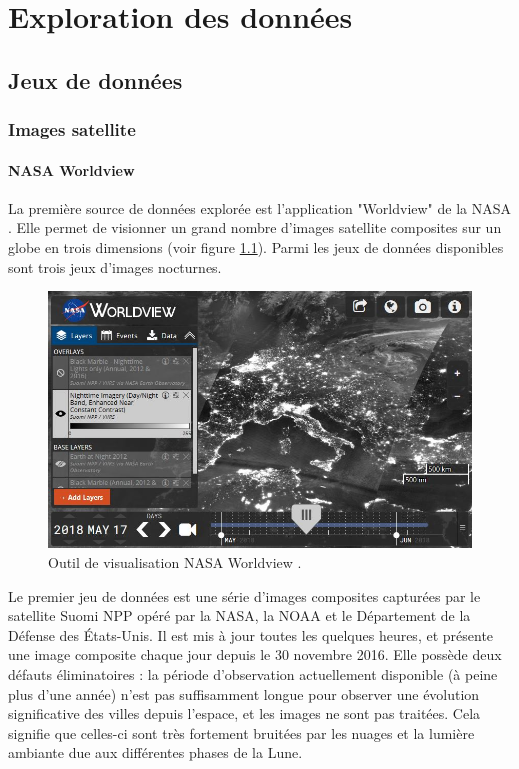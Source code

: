 \documentclass[a4paper, 11pt]{report}
\begin{document}
\chapter{Exploration des données}
\section{Jeux de données}
\subsection{Images satellite}
\subsubsection{NASA Worldview}
La première source de données explorée est l'application "Worldview" de la NASA \cite{nasa-worldview}. Elle permet de visionner un grand nombre d'images satellite composites sur un globe en trois dimensions (voir figure \ref{nasa-worldview-screenshot}). Parmi les jeux de données disponibles sont trois jeux d'images nocturnes.

\begin{figure}[h]
	\centering
	\includegraphics[width=1.0\textwidth]{img/worldview.JPG}
	\caption{Outil de visualisation NASA Worldview \cite{nasa-worldview}.}
	\label{nasa-worldview-screenshot}
\end{figure}

Le premier jeu de données est une série d'images composites capturées par le satellite Suomi NPP opéré par la NASA, la NOAA et le Département de la Défense des États-Unis. Il est mis à jour toutes les quelques heures, et présente une image composite chaque jour depuis le 30 novembre 2016. Elle possède deux défauts éliminatoires : la période d'observation actuellement disponible (à peine plus d'une année) n'est pas suffisamment longue pour observer une évolution significative des villes depuis l'espace, et les images ne sont pas traitées. Cela signifie que celles-ci sont très fortement bruitées par les nuages et la lumière ambiante due aux différentes phases de la Lune.
\end{document}
